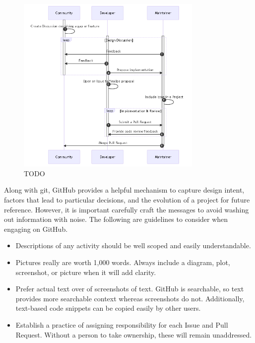 \documentclass[]{nrel}
\begin{document}
\begin{figure}[htbp] \begin{center}
\includegraphics[width=0.8\textwidth]{mermaid-bfcb6a9556227d6b8158e111ddd0f37e43e4f635.png}
\caption{TODO}
\label{fig:fig3} \end{center} \end{figure}

Along with git, GitHub provides a helpful mechanism to capture design intent, factors that lead
to particular decisions, and the evolution of a project for future reference.
However, it is important carefully craft the messages to avoid washing out information
with noise.
The following are guidelines to consider when engaging on GitHub.
\begin{itemize}
\item Descriptions of any activity should be well scoped and easily understandable.

\item Pictures really are worth 1,000 words. Always include a diagram, plot, screenshot, or picture
when it will add clarity.

\item Prefer actual text over of screenshots of text. GitHub is searchable, so text provides more
searchable context whereas screenshots do not. Additionally, text-based code snippets can be
copied easily by other users.

\item Establish a practice of assigning responsibility for each Issue and Pull Request. Without
a person to take ownership, these will remain unaddressed.

\end{itemize}
\end{document}
